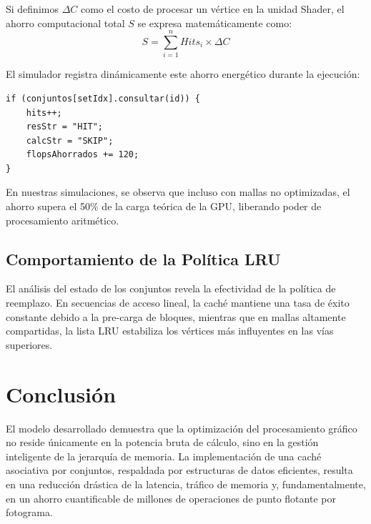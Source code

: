 \documentclass[12pt,a4paper]{article}
\begin{document}
Si definimos $\Delta C$ como el costo de procesar un vértice en la unidad Shader, el ahorro computacional total $S$ se expresa matemáticamente como:
$$S = \sum_{i=1}^{n} Hits_i \times \Delta C$$

El simulador registra dinámicamente este ahorro energético durante la ejecución:

\begin{lstlisting}
if (conjuntos[setIdx].consultar(id)) {
    hits++;
    resStr = "HIT";
    calcStr = "SKIP";
    flopsAhorrados += 120;
}
\end{lstlisting}

En nuestras simulaciones, se observa que incluso con mallas no optimizadas, el ahorro supera el 50\% de la carga teórica de la GPU, liberando poder de procesamiento aritmético.

\subsection{Comportamiento de la Política LRU}
El análisis del estado de los conjuntos revela la efectividad de la política de reemplazo. En secuencias de acceso lineal, la caché mantiene una tasa de éxito constante debido a la pre-carga de bloques, mientras que en mallas altamente compartidas, la lista LRU estabiliza los vértices más influyentes en las vías superiores.

\section{Conclusión}
El modelo desarrollado demuestra que la optimización del procesamiento gráfico no reside únicamente en la potencia bruta de cálculo, sino en la gestión inteligente de la jerarquía de memoria. La implementación de una caché asociativa por conjuntos, respaldada por estructuras de datos eficientes, resulta en una reducción drástica de la latencia, tráfico de memoria y, fundamentalmente, en un ahorro cuantificable de millones de operaciones de punto flotante por fotograma.
\end{document}
